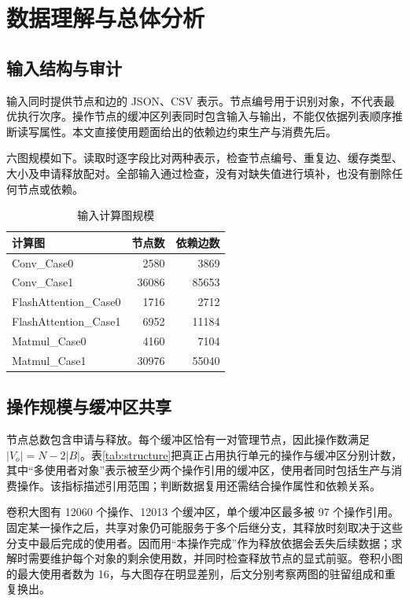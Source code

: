 \section{数据理解与总体分析}
\subsection{输入结构与审计}
输入同时提供节点和边的 JSON、CSV 表示。节点编号用于识别对象，不代表最优执行次序。操作节点的缓冲区列表同时包含输入与输出，不能仅依据列表顺序推断读写属性。本文直接使用题面给出的依赖边约束生产与消费先后。

六图规模如下。读取时逐字段比对两种表示，检查节点编号、重复边、缓存类型、大小及申请释放配对。全部输入通过检查，没有对缺失值进行填补，也没有删除任何节点或依赖。
\begin{table}[H]\centering\caption{输入计算图规模}
\begin{tabular}{lrr}\toprule 计算图 & 节点数 & 依赖边数\\\midrule
Conv\_Case0 & 2580 & 3869\\
Conv\_Case1 & 36086 & 85653\\
FlashAttention\_Case0 & 1716 & 2712\\
FlashAttention\_Case1 & 6952 & 11184\\
Matmul\_Case0 & 4160 & 7104\\
Matmul\_Case1 & 30976 & 55040\\\bottomrule
\end{tabular}\end{table}

\subsection{操作规模与缓冲区共享}
节点总数包含申请与释放。每个缓冲区恰有一对管理节点，因此操作数满足 $|V_o|=N-2|B|$。表\ref{tab:structure}把真正占用执行单元的操作与缓冲区分别计数，其中“多使用者对象”表示被至少两个操作引用的缓冲区，使用者同时包括生产与消费操作。该指标描述引用范围；判断数据复用还需结合操作属性和依赖关系。
\begin{table}[H]\centering{}
\caption{操作规模与缓冲区引用结构}\label{tab:structure}
\end{table}

卷积大图有 12060 个操作、12013 个缓冲区，单个缓冲区最多被 97 个操作引用。固定某一操作之后，共享对象仍可能服务于多个后继分支，其释放时刻取决于这些分支中最后完成的使用者。因而用“本操作完成”作为释放依据会丢失后续数据；求解时需要维护每个对象的剩余使用数，并同时检查释放节点的显式前驱。卷积小图的最大使用者数为 16，与大图存在明显差别，后文分别考察两图的驻留组成和重复换出。

